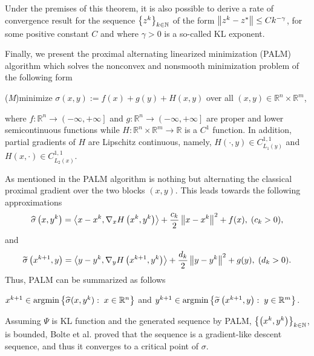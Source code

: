 \begin{remark}
Under the premises of this theorem, it is also possible to derive a rate of convergence result for the sequence $\left\lbrace z^k \right\rbrace_{k \in \mathbb{N}}$ of the form $\left\Vert {z^k - z^{*}} \right\Vert \leq Ck^{-\gamma}$, for some positive constant $C$ and where $\gamma>0$ is a so-called KL exponent.
\end{remark}

Finally, we present the proximal alternating linearized minimization (PALM) algorithm which solves the nonconvex and nonsmooth minimization problem of the following form
\begin{center}
(\textit{M})\quad minimize $\sigma(x,y):=f(x)+g(y)+H(x,y)$ over all $(x,y) \in \mathbb{R}^n \times \mathbb{R}^m$,
\end{center}
where $f:\mathbb{R}^n \rightarrow \left(-\infty,+\infty\right]$ and $g:\mathbb{R}^n \rightarrow \left(-\infty,+\infty\right]$ are proper and lower semicontinuous functions while $H:\mathbb{R}^n \times \mathbb{R}^m \rightarrow \mathbb{R}$ is a $C^1$ function. In addition, partial gradients of $H$ are Lipschitz continuous, namely, $H(\cdot, y) \in C^{1,1}_{L_1(y)}$ and $H(x,\cdot) \in C^{1,1}_{L_2(x)}$.\medskip

As mentioned in \cite{BST2014} the PALM algorithm is nothing but alternating the classical proximal gradient over the two blocks $(x,y)$. This leads towards the following approximations 
\begin{equation*}
	\widehat{\sigma}\left(x,y^k\right) = \left\langle x-x^k, \nabla_x H\left( x^k, y^k \right)\right\rangle + \frac{c_k}{2}\left\Vert {x-x^k} \right\Vert^2 + f(x), \; (c_k>0),
\end{equation*}
and
\begin{equation*}
	\widetilde{\sigma}\left(x^{k+1},y\right) = \left\langle y-y^k, \nabla_y H\left( x^{k+1}, y^k \right)\right\rangle + \frac{d_k}{2}\left\Vert {y-y^k} \right\Vert^2 + g(y), \; (d_k>0).
\end{equation*}
Thus, PALM can be summarized as follows
\begin{center}
$x^{k+1} \in \arg\!\min \left\lbrace \widehat{\sigma}(x,y^k) : \; x \in \mathbb{R}^n \right\rbrace$ \quad and \quad $y^{k+1} \in \arg\!\min \left\lbrace \widetilde{\sigma}\left(x^{k+1},y\right) : \; y \in \mathbb{R}^m \right\rbrace$.
\end{center}
Assuming $\Psi$ is KL function and the generated sequence by PALM, $\left\lbrace \left( x^k, y^k\right)\right\rbrace_{k \in \mathbb{N}}$, is bounded, Bolte et al. \cite{BST2014} proved that the sequence is a gradient-like descent sequence, and thus it converges to a critical point of $\sigma$. 
